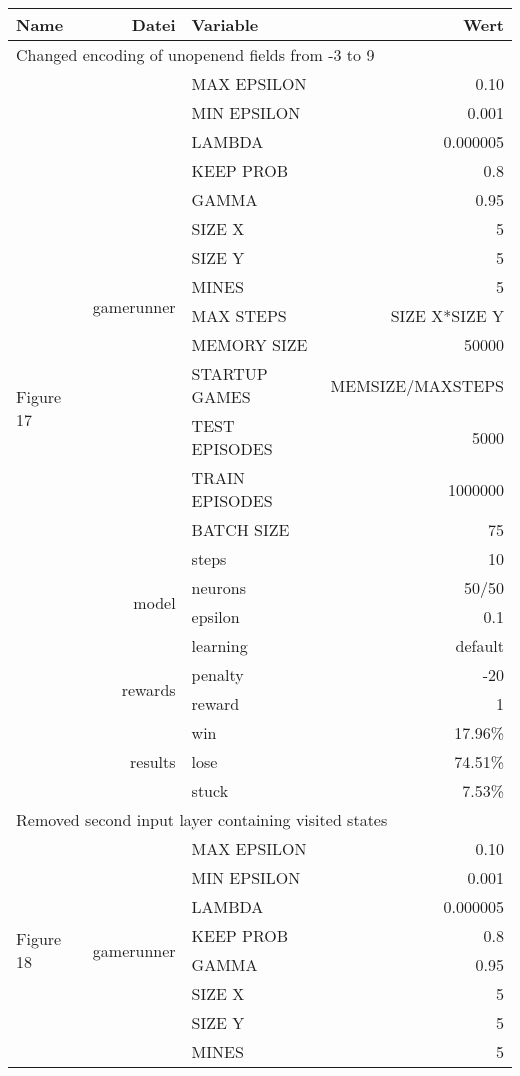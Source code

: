 \documentclass[9pt]{article}
\begin{document}
\begin{tabularx}{\textwidth}{l|r|X|r}
	Name & Datei & Variable & Wert \\
	\hline
	\multicolumn{4}{l}{Changed encoding of unopenend fields from -3 to 9} \\
	\multirow{21}{*}{Figure 17} & \multirow{14}{*}{gamerunner} & MAX EPSILON	& 0.10\\
	& & MIN EPSILON	& 0.001 \\
	& & LAMBDA & 0.000005 \\
	& & KEEP PROB & 0.8 \\
	& & GAMMA	& 0.95 \\
	& & SIZE X & 5 \\
	& & SIZE Y & 5 \\
	& & MINES & 5 \\
	& & MAX STEPS & SIZE X*SIZE Y\\
	& & MEMORY SIZE & 50000 \\
	& & STARTUP GAMES & MEMSIZE/MAXSTEPS \\
	& & TEST EPISODES & 5000 \\
	& & TRAIN EPISODES & 1000000 \\
	& & BATCH SIZE & 75 \\
	& & steps & 10\\\cline{2-4}
	& \multirow{2}{*}{model} & neurons & 50/50 \\ 
	& & epsilon & 0.1\\
	& & learning & default \\\cline{2-4}
	& \multirow{2}{*}{rewards} & penalty & -20\\
	& & reward & 1\\\cline{2-4}
	& \multirow{3}{*}{results} & win & 17.96\%\\
	& & lose & 74.51\%\\
	& & stuck & 7.53\%\\
	\hline
	\hline
	\multicolumn{4}{l}{Removed second input layer containing visited states} \\
	\multirow{21}{*}{Figure 18} & \multirow{14}{*}{gamerunner} & MAX EPSILON	& 0.10\\
	& & MIN EPSILON	& 0.001 \\
	& & LAMBDA & 0.000005 \\
	& & KEEP PROB & 0.8 \\
	& & GAMMA	& 0.95 \\
	& & SIZE X & 5 \\
	& & SIZE Y & 5 \\
	& & MINES & 5 \\

\end{tabularx}
\end{document}
